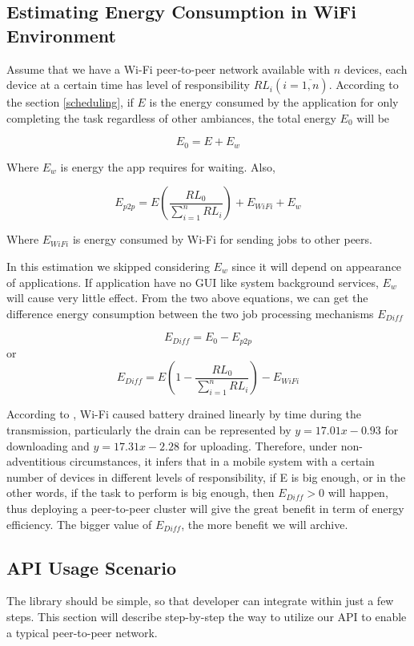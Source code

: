 \documentclass[conference]{IEEEtran}
\begin{document}
\subsection{Estimating Energy Consumption in WiFi Environment}
Assume that we have a Wi-Fi peer-to-peer network available with $n$ devices, each device at a certain time has level of responsibility $RL_{i} (i = \overline{1,n})$. According to the section \ref{scheduling}, if $E$ is the energy consumed by the application for only completing the task regardless of other ambiances, the total energy $E_{0}$ will be

$$E_{0} = E + E_{w}$$

Where $E_{w}$ is energy the app requires for waiting. Also, 

$$E_{p2p} = E(\frac{RL_{0}}{\sum_{i = 1}^{n}{RL_{i}}}) + E_{WiFi} + E_{w}$$ 

Where $E_{WiFi}$ is energy consumed by Wi-Fi for sending jobs to other peers.

In this estimation we skipped considering $E_{w}$ since it will depend on appearance of applications. If application have no GUI like system background services, $E_{w}$ will cause very little effect. From the two above equations, we can get the difference energy consumption between the two job processing mechanisms $E_{Diff}$ 

$$E_{Diff} = E_{0} - E_{p2p}$$ or $$E_{Diff} = E(1 - \frac{RL_{0}}{\sum_{i=1}^{n}{RL_{i}}}) - E_{WiFi}$$

According to \cite{wifi_energy}, Wi-Fi caused battery drained linearly by time during the transmission, particularly the drain can be represented by $y = 17.01x - 0.93$ for downloading and $y = 17.31x - 2.28$ for uploading. Therefore, under non-adventitious circumstances, it infers that in a mobile system with a certain number of devices in different levels of responsibility, if E is big enough, or in the other words, if the task to perform is big enough, then $E_{Diff} > 0$ will happen, thus deploying a peer-to-peer cluster will give the great benefit in term of energy efficiency. The bigger value of $E_{Diff}$, the more benefit we will archive.

\subsection{API Usage Scenario}

The library should be simple, so that developer can integrate within just a few steps. This section will describe step-by-step the way to utilize our API to enable a typical peer-to-peer network.
\end{document}
